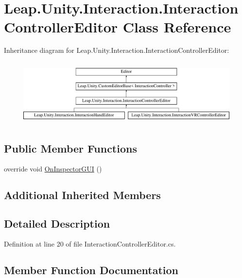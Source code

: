\hypertarget{class_leap_1_1_unity_1_1_interaction_1_1_interaction_controller_editor}{}\section{Leap.\+Unity.\+Interaction.\+Interaction\+Controller\+Editor Class Reference}
\label{class_leap_1_1_unity_1_1_interaction_1_1_interaction_controller_editor}
Inheritance diagram for Leap.\+Unity.\+Interaction.\+Interaction\+Controller\+Editor\+:\begin{figure}[H]
\begin{center}
\leavevmode
\includegraphics[height=3.446154cm]{class_leap_1_1_unity_1_1_interaction_1_1_interaction_controller_editor}
\end{center}
\end{figure}
\subsection*{Public Member Functions}
\begin{DoxyCompactItemize}
\item 
override void \mbox{\hyperlink{class_leap_1_1_unity_1_1_interaction_1_1_interaction_controller_editor_a7bae22a828def81277b29f178e0180fa}{On\+Inspector\+G\+UI}} ()
\end{DoxyCompactItemize}
\subsection*{Additional Inherited Members}


\subsection{Detailed Description}


Definition at line 20 of file Interaction\+Controller\+Editor.\+cs.



\subsection{Member Function Documentation}
\mbox{\label{class_leap_1_1_unity_1_1_interaction_1_1_interaction_controller_editor_a7bae22a828def81277b29f178e0180fa}} 
